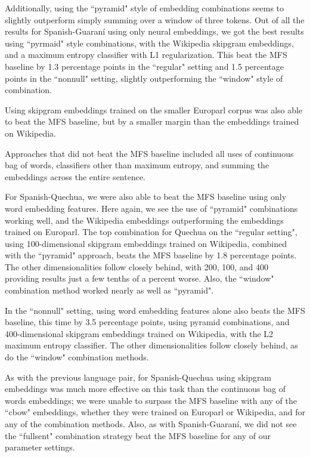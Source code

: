Additionally, using the ``pyramid" style of embedding combinations seems to
slightly outperform simply summing over a window of three tokens. Out of all
the results for Spanish-Guaraní using only neural embeddings, we got the best
results using ``pyrmaid" style combinations, with the Wikipedia skipgram
embeddings, and a maximum entropy classifier with L1 regularization. This beat
the MFS baseline by 1.3 percentage points in the ``regular" setting and 1.5
percentage points in the ``nonnull" setting, slightly outperforming the
``window" style of combination.

Using skipgram embeddings trained on the smaller Europarl corpus was also able
to beat the MFS baseline, but by a smaller margin than the embeddings trained
on Wikipedia.

Approaches that did not beat the MFS baseline included all uses of continuous
bag of words, classifiers other than maximum entropy, and summing the
embeddings across the entire sentence.

For Spanish-Quechua, we were also able to beat the MFS baseline using only word
embedding features. Here again, we see the use of ``pyramid" combinations
working well, and the Wikipedia embeddings outperforming the embeddings trained
on Europarl. The top combination for Quechua on the ``regular setting", using
100-dimensional skipgram embeddings trained on Wikipedia, combined with the
``pyramid" approach, beats the MFS baseline by 1.8 percentage points. The other
dimensionalities follow closely behind, with 200, 100, and 400 providing
results just a few tenths of a percent worse. Also, the ``window" combination
method worked nearly as well as ``pyramid".

In the ``nonnull" setting, using word embedding features alone also beats the
MFS baseline, this time by 3.5 percentage points, using pyramid combinations,
and 400-dimensional skipgram embeddings trained on Wikipedia, with the L2
maximum entropy classifier. The other dimensionalities follow closely behind,
as do the ``window" combination methods.

As with the previous language pair, for Spanish-Quechua using skipgram
embeddings was much more effective on this task than the continuous bag of
words embeddings; we were unable to surpass the MFS baseline with any of the
``cbow" embeddings, whether they were trained on Europarl or Wikipedia, and for
any of the combination methods. Also, as with Spanish-Guaraní, we did not see
the ``fullsent" combination strategy beat the MFS baseline for any of our
parameter settings.

